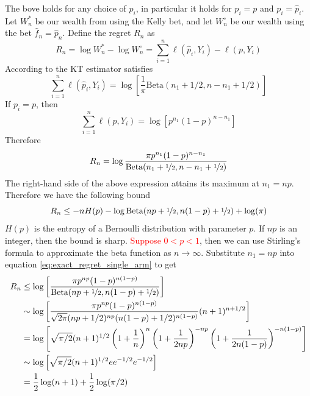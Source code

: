 \documentclass[letterpaper]{article}
\numberwithin{equation}{section}
\theoremstyle{plain}
\begin{document}
The bove holds for any choice of $p_i$, in particular it holds for $p_i=p$ and $p_i=\hat{p}_i$. Let $W_n^*$ be our wealth from using the Kelly bet, and let $W_n^\circ$ be our wealth using the bet $\hat{f}_n = \hat{p}_n$. Define the regret $R_n$ as
\begin{equation}
R_n = \log W_n^* - \log W_n^\circ = \sum_{i=1}^n \ell(\hat{p}_i,Y_i) - \ell(p,Y_i)
\end{equation}
According to \cite{cesa2006prediction} the KT estimator satisfies
\begin{equation}
\sum_{i=1}^n \ell(\hat{p}_i,Y_i) = \log\left[ \frac{1}{\pi} \text{Beta}(n_1+1/2, n-n_1+1/2) \right]
\end{equation}
If $p_i = p$, then
\begin{equation}
\sum_{i=1}^n \ell(p,Y_i) = \log\left[p^{n_1}(1-p)^{n-n_1}\right]
\end{equation}
Therefore
\begin{equation}\label{eq:exact_regret_single_arm}
R_n = \log\frac{\pi p^{n_1}(1-p)^{n-n_1}}{\text{Beta}(n_1+\nicefrac{1}{2}, n-n_1 + \nicefrac{1}{2})}
\end{equation}
The right-hand side of the above expression attains its maximum at $n_1 = np$. Therefore we have the following bound
\begin{equation}\label{kt_regret_bound}
R_n \le -nH(p) -\log \text{Beta}(np+\nicefrac{1}{2}, n(1-p)+\nicefrac{1}{2}) + \log(\pi)
\end{equation}
$H(p)$ is the entropy of a Bernoulli distribution with parameter $p$. If $np$ is an integer, then the bound is sharp. \textcolor{red}{Suppose $0 < p < 1$}, then we can use Stirling's formula to approximate the beta function as $n\to\infty$. Substitute $n_1=np$ into equation \ref{eq:exact_regret_single_arm} to get
\begin{align}
R_n &\le \log\left[\frac{\pi p^{np}(1-p)^{n(1-p)}}{\text{Beta}(np+\nicefrac{1}{2}, n(1-p) + \nicefrac{1}{2})}\right]\\
&\sim \log \left[\frac{\pi p^{np} (1-p)^{n(1-p)}}{\sqrt{2\pi}(np+1/2)^{np} (n(1-p)+1/2)^{n(1-p)}} (n+1)^{n+1/2} \right]\\
&=\log\left[\sqrt{\pi/2} (n+1)^{1/2} \left(1+\frac{1}{n}\right)^n \left(1+\frac{1}{2np}\right)^{-np}\left(1+\frac{1}{2n(1-p)} \right)^{-n(1-p)}\right]\\
&\sim \log\left[\sqrt{\pi/2} (n+1)^{1/2} e e^{-1/2} e^{-1/2}\right]\\
&= \frac{1}{2}\log(n+1) + \frac{1}{2}\log(\pi/2)\label{asymp_regret_bound}
\end{align}
\end{document}
